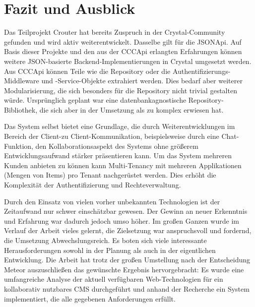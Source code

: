 \section{Fazit und Ausblick}
\label{sec:d_fazit_und_ausblick}

Das Teilprojekt Crouter hat bereits Zuspruch in der Crystal-Community gefunden
und wird aktiv weiterentwickelt.  Dasselbe gilt für die JSONApi.  Auf Basis
dieser Projekte und den aus der CCCApi erlangten Erfahrungen können weitere
JSON-basierte Backend-Implementierungen in Crystal umgesetzt werden.  Aus
CCCApi können Teile wie die Repository oder die Authentifizierungs-Middleware
und -Service-Objekte extrahiert werden.  Dies bedarf aber weiterer
Modularisierung, die sich besonders für die Repository nicht trivial gestalten
würde.  Ursprünglich geplant war eine datenbankagnostische
Repository-Bibliothek, die sich aber in der Umsetzung als zu komplex erwiesen
hat.

Das System selbst bietet eine Grundlage, die durch Weiterentwicklungen im
Bereich der Client-zu Client-Kommunikation, beispielsweise durch eine
Chat-Funktion, den Kollaborationsaspekt des Systems ohne größerem
Entwicklungsaufwand stärker präsentieren kann.  Um das System mehreren Kunden
anbieten zu können kann Multi-Tenancy mit mehreren Applikationen (Mengen von
Items) pro Tenant nachgerüstet werden.  Dies erhöht die Komplexität der
Authentifizierung und Rechteverwaltung.

Durch den Einsatz von vielen vorher unbekannten Technologien ist der
Zeitaufwand nur schwer einschätzbar gewesen.  Der Gewinn an neuer Erkenntnis
und Erfahrung war dadurch jedoch umso höher.  Im großen Ganzen wurde im Verlauf
der Arbeit vieles gelernt,  die Zielsetzung war anspruchsvoll und fordernd, die
Umsetzung Abwechslungsreich.  Es boten sich viele interessante
Herausforderungen sowohl in der Planung als auch in der eigentlichen
Entwicklung.  Die Arbeit hat trotz der großen Umstellung nach der Entscheidung
Meteor auszuschließen das gewünschte Ergebnis hervorgebracht:  Es wurde eine
umfangreiche Analyse der aktuell verfügbaren Web-Technologien für ein
kollaborativ nutzbares CMS durchgeführt und anhand der Recherche ein System
implementiert, die alle gegebenen Anforderungen erfüllt.
